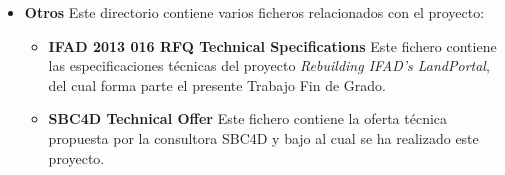 \begin{itemize}
\begin{itemize}
			\item \textbf{Landportal drupal\footnote{\url{https://github.com/weso/landportal_model}}}  Este directorio contiene el tema y los módulos de Drupal desarrollados durante este proyecto.  El diseño de estos componentes puede consultarse en las secciones \ref{vista_modulos_cms} y \ref{vista_landportal_uris}.
			\item \textbf{Landportal receiver\footnote{\url{https://github.com/weso/landportal-receiver}}}  Este directorio contiene el Punto de Entrada de Datos del sistema.  El diseño de este componente fue explicado anteriormente en la sección \ref{vista_receiver}.
		\end{itemize}	
	\item \textbf{Otros}  Este directorio contiene varios ficheros relacionados con el proyecto:
		\begin{itemize}
			\item \textbf{IFAD 2013 016 RFQ Technical Specifications}  Este fichero contiene las especificaciones técnicas del proyecto \textit{Rebuilding IFAD's LandPortal}, del cual forma parte el presente Trabajo Fin de Grado.
			\item \textbf{SBC4D Technical Offer}  Este fichero contiene la oferta técnica propuesta por la consultora SBC4D y bajo al cual se ha realizado este proyecto.
		\end{itemize}
\end{itemize}